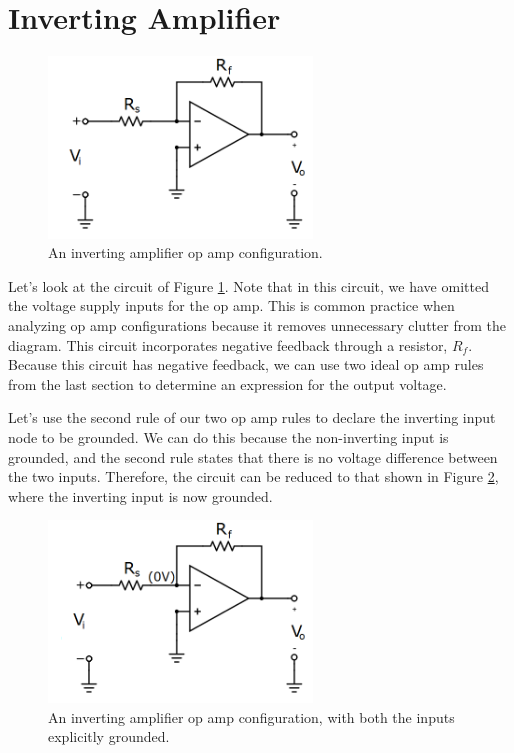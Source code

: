 \section{Inverting Amplifier}
\begin{figure}[h!]
\centering
\includegraphics[width=7cm]{figures/invertingAmplifier.png}
\caption{An inverting amplifier op amp configuration.}
\label{invertingAmplifier}
\end{figure}
Let's look at the circuit of Figure \ref{invertingAmplifier}. Note that in this circuit, we have omitted the voltage supply inputs for the op amp. This is common practice when analyzing op amp configurations because it removes unnecessary clutter from the diagram. This circuit incorporates negative feedback through a resistor, $R_f$. Because this circuit has negative feedback, we can use two ideal op amp rules from the last section to determine an expression for the output voltage.
\par
Let's use the second rule of our two op amp rules to declare the inverting input node to be grounded. We can do this because the non-inverting input is grounded, and the second rule states that there is no voltage difference between the two inputs. Therefore, the circuit can be reduced to that shown in Figure \ref{invertingAmplifier2}, where the inverting input is now grounded. 
\begin{figure}[h!]
\centering
\includegraphics[width=7cm]{figures/invertingAmplifier2.png}
\caption{An inverting amplifier op amp configuration, with both the inputs explicitly grounded.}
\label{invertingAmplifier2}
\end{figure}
